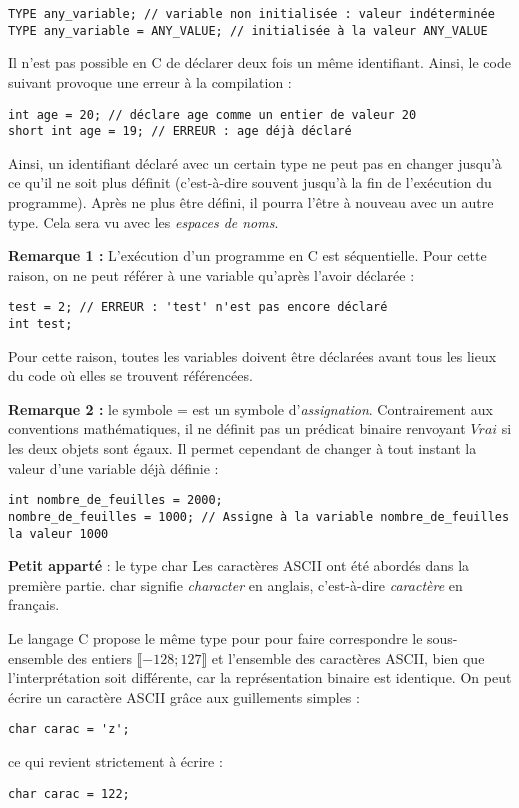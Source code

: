 \documentclass[../../../main.tex]{subfiles}
\begin{document}
\begin{verbatim}
TYPE any_variable; // variable non initialisée : valeur indéterminée
TYPE any_variable = ANY_VALUE; // initialisée à la valeur ANY_VALUE
\end{verbatim}
Il n'est pas possible en C de déclarer deux fois un même identifiant. Ainsi, le code suivant provoque une erreur à la compilation :
\begin{verbatim}
int age = 20; // déclare age comme un entier de valeur 20
short int age = 19; // ERREUR : age déjà déclaré
\end{verbatim}
Ainsi, un identifiant déclaré avec un certain type ne peut pas en changer jusqu'à ce qu'il ne soit plus définit (c'est-à-dire souvent jusqu'à la fin de l'exécution du programme). Après ne plus être défini, il pourra l'être à nouveau avec un autre type. Cela sera vu avec les \textit{espaces de noms}.
 
\textbf{Remarque 1 :} L'exécution d'un programme en C est séquentielle. Pour cette raison, on ne peut référer à une variable qu'après l'avoir déclarée :
\begin{verbatim}
test = 2; // ERREUR : 'test' n'est pas encore déclaré
int test;
\end{verbatim}
Pour cette raison, toutes les variables doivent être déclarées avant tous les lieux du code où elles se trouvent référencées.
 
\textbf{Remarque 2 :} le symbole \textsf{=} est un symbole d'\textit{assignation}. Contrairement aux conventions mathématiques, il ne définit pas un prédicat binaire renvoyant $Vrai$ si les deux objets sont égaux. Il permet cependant de changer à tout instant la valeur d'une variable déjà définie :
\begin{verbatim}
int nombre_de_feuilles = 2000;
nombre_de_feuilles = 1000; // Assigne à la variable nombre_de_feuilles la valeur 1000
\end{verbatim}

\begin{minitelbasicbox}{\textbf{Petit apparté} : le type \textsf{char}}
Les caractères ASCII ont été abordés dans la première partie. \textsf{char} signifie \textit{character} en anglais, c'est-à-dire \textit{caractère} en français.

Le langage C propose le même type pour pour faire correspondre le sous-ensemble des entiers $\llbracket-128; 127\rrbracket$ et l'ensemble des caractères ASCII, bien que l'interprétation soit différente, car la représentation binaire est identique. On peut écrire un caractère ASCII grâce aux guillements simples :
\begin{verbatim}
char carac = 'z';
\end{verbatim}
ce qui revient strictement à écrire :
\begin{verbatim}
char carac = 122;
\end{verbatim}
\end{minitelbasicbox}
\end{document}
